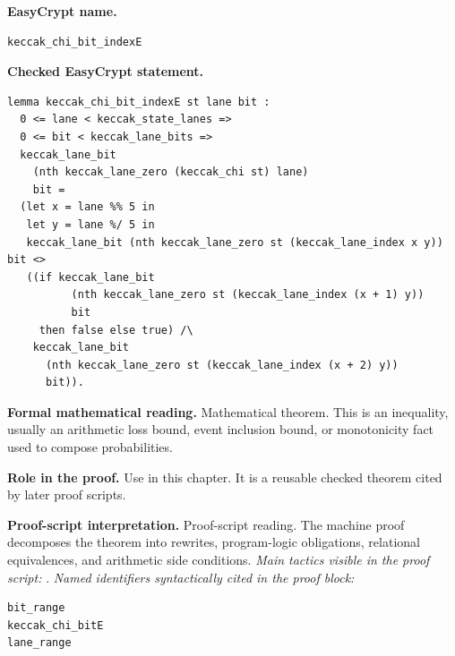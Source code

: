 \begin{formaltheorem}
\noindent\textbf{EasyCrypt name.}
\begin{lstlisting}[language=EasyCrypt,basicstyle=\ttfamily\scriptsize]
keccak_chi_bit_indexE
\end{lstlisting}
\noindent\textbf{Checked EasyCrypt statement.}
\begin{lstlisting}[language=EasyCrypt,basicstyle=\ttfamily\scriptsize]
lemma keccak_chi_bit_indexE st lane bit :
  0 <= lane < keccak_state_lanes =>
  0 <= bit < keccak_lane_bits =>
  keccak_lane_bit
    (nth keccak_lane_zero (keccak_chi st) lane)
    bit =
  (let x = lane %% 5 in
   let y = lane %/ 5 in
   keccak_lane_bit (nth keccak_lane_zero st (keccak_lane_index x y)) bit <>
   ((if keccak_lane_bit
          (nth keccak_lane_zero st (keccak_lane_index (x + 1) y))
          bit
     then false else true) /\
    keccak_lane_bit
      (nth keccak_lane_zero st (keccak_lane_index (x + 2) y))
      bit)).
\end{lstlisting}
\noindent\textbf{Formal mathematical reading.}
Mathematical theorem. This is an inequality, usually an arithmetic loss bound, event inclusion bound, or monotonicity fact used to compose probabilities.

\noindent\textbf{Role in the proof.}
Use in this chapter. It is a reusable checked theorem cited by later proof scripts.

\noindent\textbf{Proof-script interpretation.}
Proof-script reading. The machine proof decomposes the theorem into rewrites, program-logic obligations, relational equivalences, and arithmetic side conditions.
\emph{Main tactics visible in the proof script:} \ec{rewrite}.
\emph{Named identifiers syntactically cited in the proof block:}
\begin{lstlisting}[language=EasyCrypt,basicstyle=\ttfamily\scriptsize]
bit_range
keccak_chi_bitE
lane_range
\end{lstlisting}

\end{formaltheorem}

